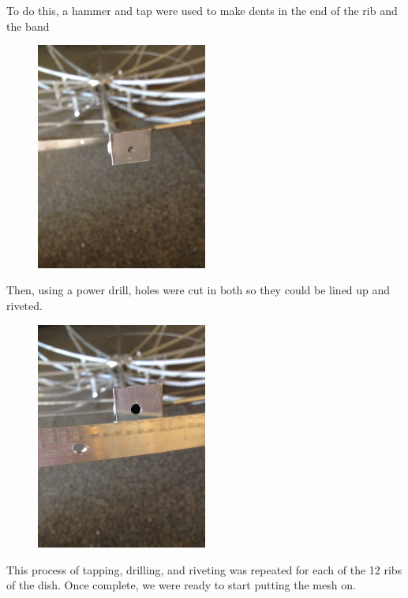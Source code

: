 \documentclass[11pt]{article} %
\begin{document}
To do this, a hammer and tap were used to make dents in the end of the rib and the band

\begin{figure}
  \centering
  \caption{   }
  \includegraphics[width=0.50\textwidth]{dish/05.jpeg}
\end{figure}

Then, using a power drill, holes were cut in both so they could be lined up and riveted.

\begin{figure}
  \centering
  \caption{   }
  \includegraphics[width=0.50\textwidth]{dish/06.jpeg}
\end{figure}


This process of tapping, drilling, and riveting was repeated for each of the 12 ribs of the dish. Once complete, we were ready to start putting the mesh on.
\end{document}
